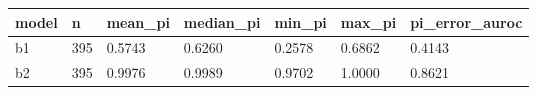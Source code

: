 \begin{tabular}{lllllll}
\hline
model & n & mean\_pi & median\_pi & min\_pi & max\_pi & pi\_error\_auroc \\
\hline
b1 & 395 & 0.5743 & 0.6260 & 0.2578 & 0.6862 & 0.4143 \\
b2 & 395 & 0.9976 & 0.9989 & 0.9702 & 1.0000 & 0.8621 \\
\hline
\end{tabular}

